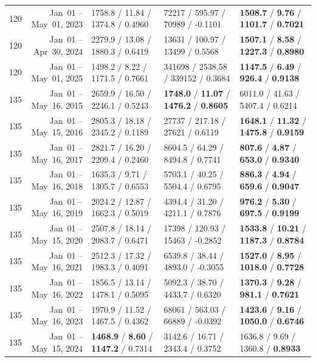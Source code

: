 \begin{longtable}{r r l l l}
120 & Jan~01 -- May~01, 2023 & 1758.8 / 11.84 / 1374.8 / 0.4960 & 72217 / 595.97 / 70989 / -0.1101 & \textbf{1508.7} / \textbf{9.76} / \textbf{1101.7} / \textbf{0.7021} \\
120 & Jan~01 -- Apr~30, 2024 & 2279.9 / 13.08 / 1880.3 / 0.6419 & 13631 / 100.97 / 13499 / 0.5568 & \textbf{1507.1} / \textbf{8.58} / \textbf{1227.3} / \textbf{0.8980} \\
120 & Jan~01 -- May~01, 2025 & 1498.2 / 8.22 / 1171.5 / 0.7661 & 341698 / 2538.58 / 339152 / 0.3684 & \textbf{1147.5} / \textbf{6.49} / \textbf{926.4} / \textbf{0.9138} \\
\midrule
135 & Jan~01 -- May~16, 2015 & 2659.9 / 16.50 / 2246.1 / 0.5243 & \textbf{1748.0} / \textbf{11.07} / \textbf{1476.2} / \textbf{0.8605} & 6011.0 / 41.63 / 5407.4 / 0.6214 \\
135 & Jan~01 -- May~15, 2016 & 2805.3 / 18.18 / 2345.2 / 0.1189 & 27737 / 217.18 / 27621 / 0.6119 & \textbf{1648.1} / \textbf{11.32} / \textbf{1475.8} / \textbf{0.9159} \\
135 & Jan~01 -- May~16, 2017 & 2821.7 / 16.20 / 2209.4 / 0.2460 & 8604.5 / 64.29 / 8494.8 / 0.7741 & \textbf{807.6} / \textbf{4.87} / \textbf{653.0} / \textbf{0.9340} \\
135 & Jan~01 -- May~16, 2018 & 1635.3 / 9.71 / 1305.7 / 0.6553 & 5703.1 / 40.25 / 5504.4 / 0.6795 & \textbf{886.3} / \textbf{4.94} / \textbf{659.6} / \textbf{0.9047} \\
135 & Jan~01 -- May~16, 2019 & 2024.2 / 12.87 / 1662.3 / 0.5019 & 4394.4 / 31.20 / 4211.1 / 0.7876 & \textbf{976.2} / \textbf{5.30} / \textbf{697.5} / \textbf{0.9199} \\
135 & Jan~01 -- May~15, 2020 & 2507.8 / 18.14 / 2083.7 / 0.6471 & 17398 / 120.93 / 15463 / -0.2852 & \textbf{1533.8} / \textbf{10.21} / \textbf{1187.3} / \textbf{0.8784} \\
135 & Jan~01 -- May~16, 2021 & 2512.3 / 17.32 / 1983.3 / 0.4091 & 6539.8 / 38.44 / 4893.0 / -0.3055 & \textbf{1527.0} / \textbf{8.95} / \textbf{1018.0} / \textbf{0.7728} \\
135 & Jan~01 -- May~16, 2022 & 1856.5 / 13.14 / 1478.1 / 0.5095 & 5092.3 / 38.70 / 4433.7 / 0.6320 & \textbf{1370.3} / \textbf{9.28} / \textbf{981.1} / \textbf{0.7621} \\
135 & Jan~01 -- May~16, 2023 & 1970.9 / 11.52 / 1467.5 / 0.4362 & 68061 / 563.03 / 66889 / -0.0392 & \textbf{1423.6} / \textbf{9.16} / \textbf{1050.0} / \textbf{0.6746} \\
135 & Jan~01 -- May~15, 2024 & \textbf{1468.9} / \textbf{8.60} / \textbf{1147.2} / 0.7314 & 3142.6 / 16.71 / 2343.4 / 0.3752 & 1636.8 / 9.69 / 1360.8 / \textbf{0.8933} \\

\end{longtable}
